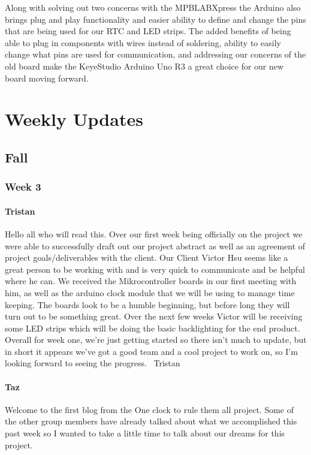 \documentclass[onecolumn, draftclsnofoot,10pt, compsoc]{IEEEtran}
\begin{document}
Along with solving out two concerns with the MPBLABXpress the Arduino also brings plug and play functionality and easier ability to define and change the pins that are being used for our RTC and LED strips. The added benefits of being able to plug in components with wires instead of soldering, ability to easily change what pins are used for communication, and addressing our concerns of the old board make the KeyeStudio Arduino Uno R3 a great choice for our new board moving forward.

\section{Weekly Updates}
\subsection{Fall}
\subsubsection{Week 3}
\paragraph{Tristan}
Hello all who will read this.
Over our first week being officially on the project we were able to successfully draft out our project abstract as well as an agreement of project goals/deliverables with the client. Our Client Victor Hsu seems like a great person to be working with and is very quick to communicate and be helpful where he can. We received the Mikrocontroller boards in our first meeting with him, as well as the arduino clock module that we will be using to manage time keeping. The boards look to be a humble beginning, but before long they will turn out to be something great. Over the next few weeks Victor will be receiving some LED strips which will be doing the basic backlighting for the end product.
Overall for week one, we're just getting started so there isn't much to update, but in short it appears we've got a good team and a cool project to work on, so I'm looking forward to seeing the progress.
~Tristan
\paragraph{Taz}
Welcome to the first blog from the One clock to rule them all project. Some of the other group members have already talked about what we accomplished this past week so I wanted to take a little time to talk about our dreams for this project.
\end{document}

